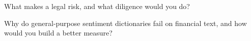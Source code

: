 \begin{interviewq}\label{iq:rs:alternative-and-text-data:5}
What makes  a legal risk, and what diligence would you do?
\end{interviewq}

\begin{interviewq}\label{iq:rs:alternative-and-text-data:6}
Why do general-purpose sentiment dictionaries fail on financial text, and how would you build a better measure?
\end{interviewq}

